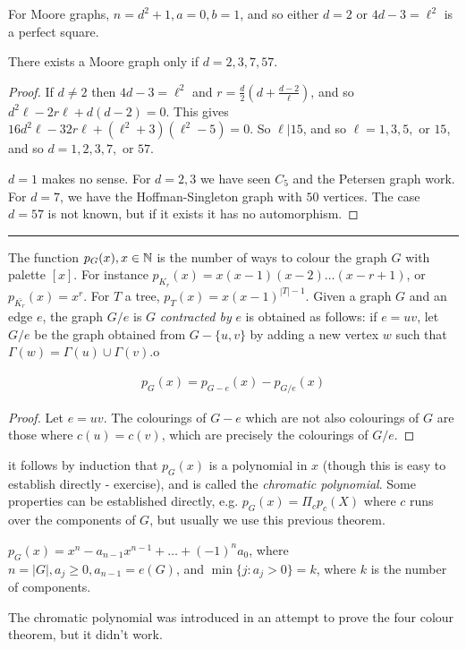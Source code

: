 \documentclass[10pt,a4paper]{article}
\begin{document}
For Moore graphs, $n=d^2 + 1, a=0, b=1$, and so either $d=2$ or $4d-3=\ell^2$ is a perfect square.
\begin{theorem}
There exists a Moore graph only if $d = 2,3,7,57$.
\end{theorem}
\begin{proof}
If $d\neq 2$ then $4d-3 = \ell^2$ and $r = \frac{d}{2}(d+\frac{d-2}{\ell})$, and so $d^2\ell-2r\ell + d(d-2) = 0$. This gives $16d^2\ell - 32 r\ell + (\ell^2+3)(\ell^2-5) = 0$. So $\ell | 15$, and so $\ell =1, 3, 5, $ or $15$, and so $d = 1, 2, 3, 7,$ or $57$.

$d=1$ makes no sense. For $d=2, 3$ we have seen $C_5$ and the Petersen graph work. For $d=7$, we have the Hoffman-Singleton graph with $50$ vertices. The case $d=57$ is not known, but if it exists it has no automorphism.
\end{proof}
\hrule
The function $p_G(x), x\in \mathbb{N}$ is the number of ways to colour the graph $G$ with palette $[x]$. For instance $p_{K_r}(x)=x(x-1)(x-2)\ldots(x-r+1)$, or $p_{\bar{K_r}}(x) = x^r$. For $T$ a tree, $p_T(x) = x(x-1)^{|T|-1}$. Given a graph $G$ and an edge $e$, the graph $G/e$ is $G$ \emph{contracted by} $e$ is obtained as follows: if $e = uv$, let $G/e$ be the graph obtained from $G-\{u,v\}$ by adding a new vertex $w$ such that $\Gamma(w) = \Gamma(u) \cup \Gamma(v)$.o
\begin{center}
\end{center}
\begin{theorem}
\begin{align*}
p_G(x) = p_{G-e}(x) - p_{G/e}(x)
\end{align*}
\end{theorem}
\begin{proof}
Let $e = uv$. The colourings of $G-e$ which are not also colourings of $G$ are those where $c(u) = c(v)$, which are precisely the colourings of $G/e$.
\end{proof}
it follows by induction that $p_G(x)$ is a polynomial in $x$ (though this is easy to establish directly - exercise), and is called the \emph{chromatic polynomial}. Some properties can be established directly, e.g. $p_G(x) = \Pi_{c}p_c(X)$ where $c$ runs over the components of $G$, but usually we use this previous theorem.

\begin{corollary}
$p_G(x) = x^n-a_{n-1}x^{n-1} + \ldots + (-1)^n a_0$, where $n=|G|, a_j \geq 0, a_{n-1}=e(G)$, and $\min\{j:a_j>0\} = k$, where $k$ is the number of components.
\end{corollary}
The chromatic polynomial was introduced in an attempt to prove the four colour theorem, but it didn't work.
\end{document}

